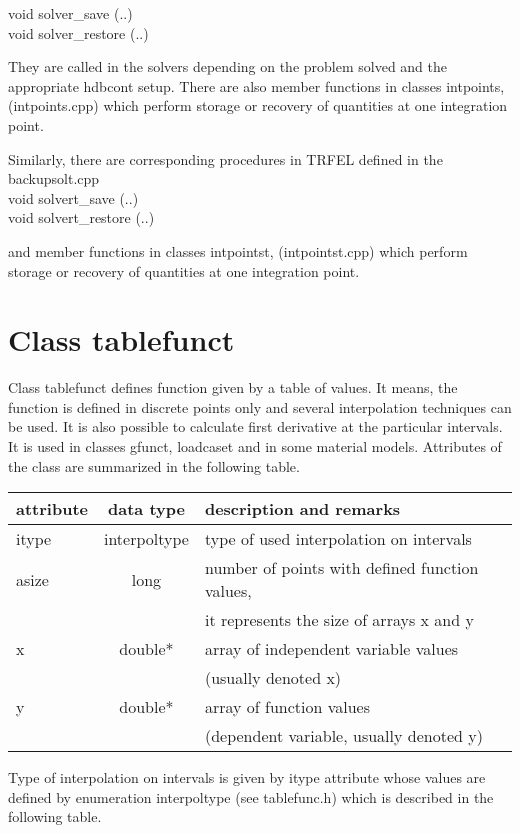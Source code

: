 {\sf
  \indent \hspace{20mm}  void solver\_save (..)\\
  \indent \hspace{20mm}  void solver\_restore (..)\\
}

They are called in the solvers depending on the problem solved and the appropriate 
{\sf hdbcont} setup. There are also member functions in classes {\sf intpoints}, ({\sf intpoints.cpp}) 
which perform storage or recovery of quantities at one integration point.

Similarly, there are corresponding procedures in TRFEL  defined in the {\sf backupsolt.cpp}\\

{\sf 
  \indent \hspace{20mm}  void solvert\_save (..)\\
  \indent \hspace{20mm}  void solvert\_restore (..)\\
}

and member functions in classes {\sf intpointst}, ({\sf intpointst.cpp}) 
which perform storage or recovery of quantities at one integration point.

\section{Class {\sf tablefunct}}
Class {\sf tablefunct} defines function given by a table of values. It means, the function is defined in 
discrete points only and several interpolation techniques can be used. It is also possible to calculate 
first derivative at the particular intervals. It is used in classes {\sf gfunct}, {\sf loadcaset} and in 
some material models. Attributes of the class are summarized in the following table.

\begin{center}
\begin{tabular}{|l|c|l|}
\hline
attribute & data type & description and remarks
\\ \hline \hline
{\sf itype} & {\sf interpoltype} & type of used interpolation on intervals
\\ \hline
{\sf asize} & {\sf long} & number of points with defined function values, \\
          &            & it represents the size of arrays {\sf x} and {\sf y}
\\ \hline
{\sf x}    & {\sf double*} &   array of independent variable values \\
          &                &  (usually denoted x)
\\ \hline
{\sf y}    & {\sf double*} &   array of function values\\
          &                &  (dependent variable, usually denoted y)
\\ \hline
\end{tabular}
\end{center}
Type of interpolation on intervals is given by {\sf itype} attribute whose values are defined by 
enumeration {\sf interpoltype} (see {\sf tablefunc.h}) which is described in the following table.

